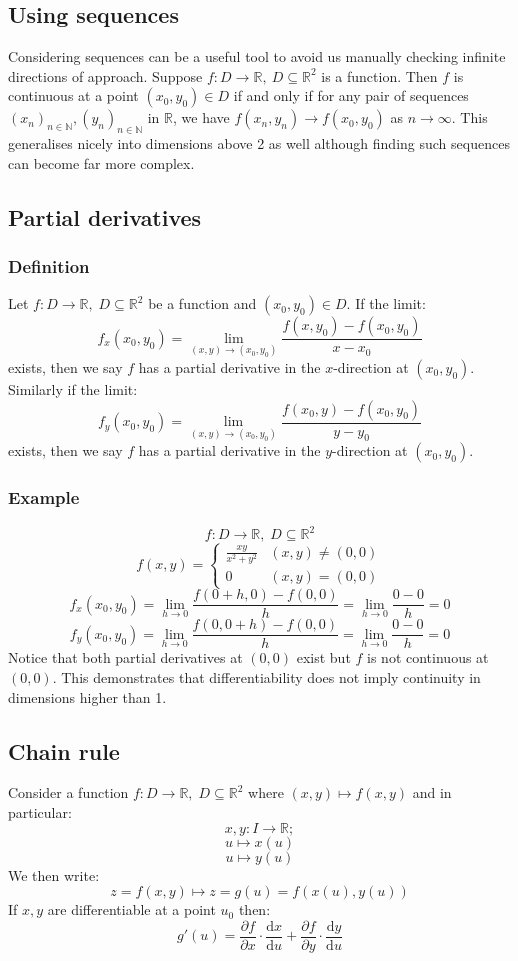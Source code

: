 \documentclass[12pt]{article}
\newcommand{\df}[2]{\frac{\text{d}#1}{\text{d}#2}}
\newcommand{\seq}[2]{(#1_#2)_{#2\in\mathbb{N}}}
\begin{document}
\subsection*{Using sequences}
Considering sequences can be a useful tool to avoid us manually checking infinite directions of approach. Suppose \(f:D\to\mathbb{R},\ D\subseteq \mathbb{R}^2\) is a function. Then \(f\) is continuous at a point \((x_0,y_0)\in D\) if and only if for any pair of sequences \(\seq{x}{n}, \seq{y}{n}\) in \(\mathbb{R}\), we have \(f(x_n,y_n)\to f(x_0,y_0)\) as \(n\to \infty\). This generalises nicely into dimensions above 2 as well although finding such sequences can become far more complex.
\subsection*{Partial derivatives}
\subsubsection*{Definition}
Let \(f:D\to\mathbb{R},\; D\subseteq \mathbb{R}^2\) be a function and \((x_0,y_0)\in D\). If the limit:
\[f_x(x_0,y_0)=\lim_{(x,y)\to(x_0,y_0)}\frac{f(x,y_0)-f(x_0,y_0)}{x-x_0}\]
exists, then we say \(f\) has a partial derivative in the \(x\)-direction at \((x_0,y_0)\). Similarly if the limit:
\[f_y(x_0,y_0)=\lim_{(x,y)\to(x_0,y_0)}\frac{f(x_0,y)-f(x_0,y_0)}{y-y_0}\]
exists, then we say \(f\) has a partial derivative in the \(y\)-direction at \((x_0,y_0)\).
\subsubsection*{Example}
\[f:D\to\mathbb{R},\;D\subseteq\mathbb{R}^2\]
\[f(x,y)=\begin{cases}
    \frac{xy}{x^2+y^2} & (x,y)\ne(0,0) \\
    0 & (x,y)=(0,0)
\end{cases}\]
\[f_x(x_0,y_0)=\lim_{h\to 0}\frac{f(0+h,0)-f(0,0)}{h}=\lim_{h\to 0}\frac{0-0}{h}=0\]
\[f_y(x_0,y_0)=\lim_{h\to 0}\frac{f(0,0+h)-f(0,0)}{h}=\lim_{h\to 0}\frac{0-0}{h}=0\]
Notice that both partial derivatives at \((0,0)\) exist but \(f\) is not continuous at \((0,0)\). This demonstrates that differentiability does not imply continuity in dimensions higher than 1.
\subsection*{Chain rule}
Consider a function \(f:D\to \mathbb{R},\;D\subseteq\mathbb{R}^2\) where \((x,y)\mapsto f(x,y)\) and in particular:
\[x,y:I\to\mathbb{R};\]
\[u\mapsto x(u)\]
\[u\mapsto y(u)\]
We then write:
\[z=f(x,y)\longmapsto z=g(u)=f(x(u),y(u))\]
If \(x,y\) are differentiable at a point \(u_0\) then:
\[g'(u)=\frac{\partial f}{\partial x}\cdot \frac{\text{d}x}{\text{d}u}+\frac{\partial f}{\partial y}\cdot\df{y}{u}\]
\end{document}
